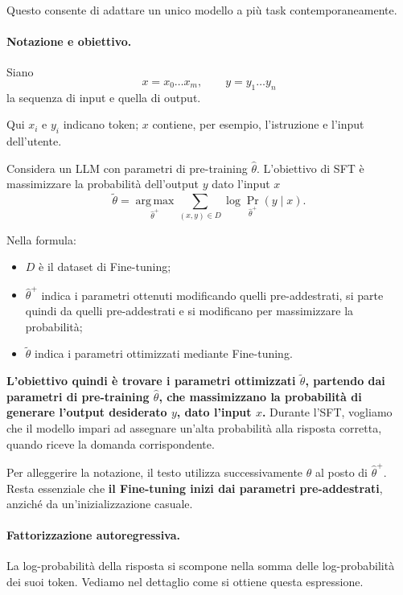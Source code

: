 Questo consente di adattare un unico modello a più task
contemporaneamente.

\paragraph{Notazione e obiettivo.}
Siano
\[
x=x_0\ldots x_m,
\qquad
y=y_1\ldots y_n
\]
la sequenza di input e quella di output.

Qui $x_i$ e $y_i$ indicano token; $x$ contiene, per esempio,
l'istruzione e l'input dell'utente.

Considera un LLM con parametri di pre-training $\hat{\theta}$. L'obiettivo di SFT è massimizzare la probabilità dell'output $y$ dato l'input $x$
\[
\tilde{\theta}
=
\operatorname*{arg\,max}_{\hat{\theta}^{+}}
\sum_{(x,y)\in D}
\log \Pr_{\hat{\theta}^{+}}(y\mid x).
\tag{4.1}
\]

Nella formula:

\begin{itemize}
    \item $D$ è il dataset di Fine-tuning;

    \item $\hat{\theta}^{+}$ indica i parametri ottenuti
    modificando quelli pre-addestrati, si parte quindi da quelli pre-addestrati e si modificano per massimizzare la probabilità;

    \item $\tilde{\theta}$ indica i parametri ottimizzati
    mediante Fine-tuning.
\end{itemize}

\textbf{L'obiettivo quindi è trovare i parametri ottimizzati \(\tilde{\theta}\), partendo dai parametri di pre-training \(\hat{\theta}\), che massimizzano la probabilità di generare l'output desiderato \(y\), dato l'input \(x\).}
Durante l'SFT, vogliamo che il modello impari ad assegnare un'alta probabilità alla risposta corretta, quando riceve la domanda corrispondente.

Per alleggerire la notazione, il testo utilizza successivamente
$\theta$ al posto di $\hat{\theta}^{+}$. Resta essenziale che
\textbf{il Fine-tuning inizi dai parametri pre-addestrati},
anziché da un'inizializzazione casuale.


\paragraph{Fattorizzazione autoregressiva.}

La log-probabilità della risposta si scompone nella somma
delle log-probabilità dei suoi token. Vediamo nel dettaglio
come si ottiene questa espressione.

